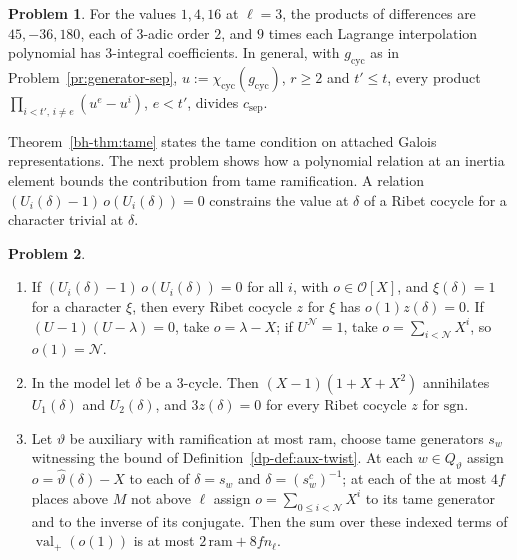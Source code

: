 \documentclass[reqno]{amsart}
\theoremstyle{definition}
\newtheorem{problem}{Problem}[section]
\theoremstyle{plain}
\newcommand{\Oc}{\mathcal{O}}
\newcommand{\val}{\operatorname{val}}
\newcommand{\cyc}{\chi_{\mathrm{cyc}}}
\newcommand{\sep}{c_{\mathrm{sep}}}
\begin{document}
\begin{problem}\label{pr:separate}
For the values \(1, 4, 16\) at \(\ell = 3\), the products of differences are \(45, -36, 180\), each of \(3\)-adic order \(2\), and \(9\) times each Lagrange interpolation polynomial has \(3\)-integral coefficients.  In general, with \(g_{\mathrm{cyc}}\) as in Problem~\ref{pr:generator-sep}, \(u := \cyc(g_{\mathrm{cyc}})\), \(r \ge 2\) and \(t' \le t\), every product \(\prod_{i < t',\, i \ne e}(u^e - u^i)\), \(e < t'\), divides \(\sep\).
\end{problem}

Theorem~\ref{bh-thm:tame} states the tame condition on attached Galois representations.  The next problem shows how a polynomial relation at an inertia element bounds the contribution from tame ramification.  A relation \((U_i(\delta) - 1)\,o(U_i(\delta)) = 0\) constrains the value at \(\delta\) of a Ribet cocycle for a character trivial at \(\delta\).

\begin{problem}\label{pr:tame}
\begin{enumerate}
\item[(a)] If \((U_i(\delta) - 1)\,o(U_i(\delta)) = 0\) for all \(i\), with \(o \in \Oc[X]\), and \(\xi(\delta) = 1\) for a character \(\xi\), then every Ribet cocycle \(z\) for \(\xi\) has \(o(1)z(\delta) = 0\).  If \((U - 1)(U - \lambda) = 0\), take \(o = \lambda - X\); if \(U^{\mathcal N} = 1\), take \(o = \sum_{i < \mathcal N} X^i\), so \(o(1) = \mathcal N\).
\item[(b)] In the model let \(\delta\) be a \(3\)-cycle.  Then \((X - 1)(1 + X + X^2)\) annihilates \(U_1(\delta)\) and \(U_2(\delta)\), and \(3z(\delta) = 0\) for every Ribet cocycle \(z\) for \(\mathrm{sgn}\).
\item[(c)] Let \(\vartheta\) be auxiliary with ramification at most \(\mathrm{ram}\), choose tame generators \(s_w\) witnessing the bound of Definition~\ref{dp-def:aux-twist}.  At each \(w \in Q_\vartheta\) assign \(o = \hat\vartheta(\delta) - X\) to each of \(\delta = s_w\) and \(\delta = (s_w^c)^{-1}\); at each of the at most \(4f\) places above \(M\) not above \(\ell\) assign \(o = \sum_{0 \le i < \mathcal N}X^i\) to its tame generator and to the inverse of its conjugate.  Then the sum over these indexed terms of \(\val_+(o(1))\) is at most \(2\,\mathrm{ram} + 8f n_\ell\).
\end{enumerate}
\end{problem}
\end{document}
